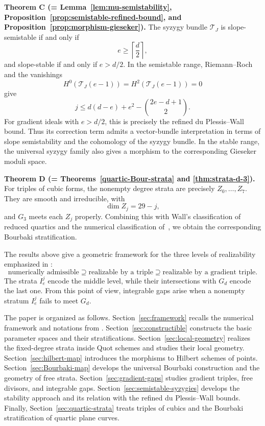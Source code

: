 \documentclass[11pt]{amsart} %
\theoremstyle{definition}
\def\T{{\mathcal T}}
\begin{document}
\medskip
\noindent
\textbf{Theorem C
(= Lemma~\ref{lem:mu-semistability},
Proposition~\ref{prop:semistable-refined-bound}, and
Proposition~\ref{prop:morphism-gieseker}).}
The syzygy bundle $\T_J$ is slope-semistable if and only if
\[
e\geq\left\lceil\frac d2\right\rceil,
\]
and slope-stable if and only if $e>d/2$. In the semistable range,
Riemann--Roch and the vanishings
\[
H^0(\T_J(e-1))
=
H^2(\T_J(e-1))
=
0
\]
give
\[
j
\leq
d(d-e)+e^2-\binom{2e-d+1}{2}.
\]
For gradient ideals with $e>d/2$, this is precisely the refined
du Plessis--Wall bound. Thus its correction term admits a
vector-bundle interpretation in terms of slope semistability and
the cohomology of the syzygy bundle. In the stable range, the
universal syzygy family also gives a morphism to the corresponding
Gieseker moduli space.

\medskip
\noindent
\textbf{Theorem D
(= Theorems~\ref{quartic-Bour-strata} and
\ref{thm:strata-d-3}).}
For triples of cubic forms, the nonempty degree strata are precisely \(Z_0,\ldots,Z_7\). They are smooth and irreducible, with
\[
\dim Z_j=29-j,
\]
and $G_3$ meets each $Z_j$ properly. Combining this with Wall's
classification of reduced quartics and the numerical classification
of~\cite[Theorem~4.1]{JMNRS2026}, we obtain the corresponding
Bourbaki stratification.

\medskip

The results above give a geometric framework for the three levels of
realizability emphasized in \cite{JMNRS2026}:
\[
\text{numerically admissible}
\supseteq
\text{realizable by a triple}
\supseteq
\text{realizable by a gradient triple}.
\]
The strata $I_e^j$ encode the middle level, while their intersections
with $G_d$ encode the last one. From this point of view, integrable
gaps arise when a nonempty stratum $I_e^j$ fails to meet $G_d$.

The paper is organized as follows.
Section~\ref{sec:framework} recalls the numerical framework and notations from \cite{JMNRS2026}.
Section~\ref{sec:constructible} constructs the basic parameter spaces
and their stratifications.
Section~\ref{sec:local-geometry} realizes the fixed-degree strata inside Quot schemes and studies their local geometry.
Section~\ref{sec:hilbert-map} introduces the morphisms to Hilbert
schemes of points.
Section~\ref{sec:Bourbaki-map} develops the universal Bourbaki
construction and the geometry of free strata.
Section~\ref{sec:gradient-gaps} studies gradient triples, free
divisors, and integrable gaps.
Section~\ref{sec:semistable-syzygies} develops the stability approach
and its relation with the refined du Plessis--Wall bounds.
Finally, Section~\ref{sec:quartic-strata} treats triples of cubics and
the Bourbaki stratification of quartic plane curves.
\end{document}
